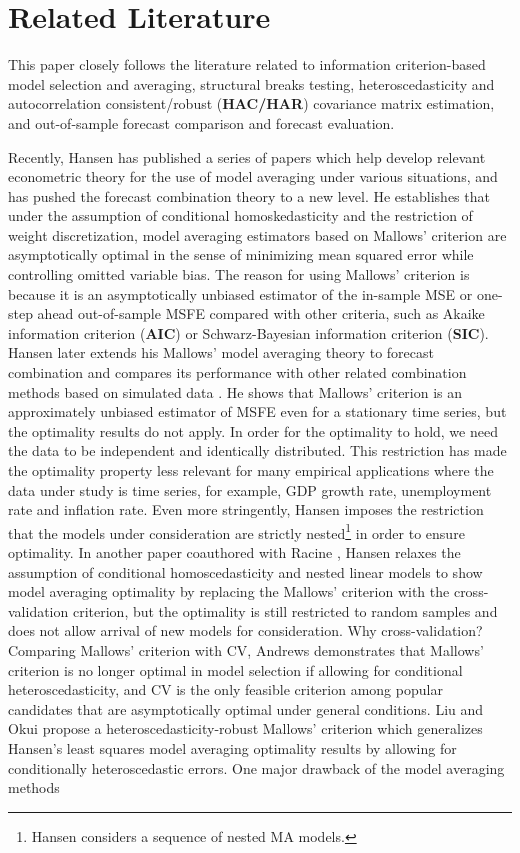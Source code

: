 \section{Related Literature}
This paper closely follows the literature related to information criterion-based model selection and averaging, structural breaks testing, heteroscedasticity and autocorrelation consistent/robust (\textbf{HAC/HAR}) covariance matrix estimation, and out-of-sample forecast comparison and forecast evaluation.

Recently, Hansen has published a series of papers \cite{hansen_EMETRICA2007} \cite{hansen_JE2008} \cite{hansen2009averaging} \cite{hansen2011jackknife} which help develop relevant econometric theory for the use of model averaging under various situations, and has pushed the forecast combination theory to a new level. He establishes that under the assumption of conditional homoskedasticity and the restriction of weight discretization, model averaging estimators based on Mallows' criterion are asymptotically optimal in the sense of minimizing mean squared error while controlling omitted variable bias. The reason for using Mallows' criterion is because it is an asymptotically unbiased estimator of the in-sample MSE or one-step ahead out-of-sample MSFE compared with other criteria, such as Akaike information criterion (\textbf{AIC}) or Schwarz-Bayesian information criterion (\textbf{SIC}). Hansen later extends his Mallows' model averaging theory to forecast combination and compares its performance with other related combination methods based on simulated data \cite{hansen_JE2008}. He shows that Mallows' criterion is an approximately unbiased estimator of MSFE even for a stationary time series, but the optimality results do not apply. In order for the optimality to hold, we need the data to be independent and identically distributed. This restriction has made the optimality property less relevant for many empirical applications where the data under study is time series, for example, GDP growth rate, unemployment rate and inflation rate. Even more stringently, Hansen imposes the restriction that the models under consideration are strictly nested\footnote{Hansen considers a sequence of nested MA models.} in order to ensure optimality. In another paper coauthored with Racine \cite{hansen2011jackknife}, Hansen relaxes the assumption of conditional homoscedasticity and nested linear models to show model averaging optimality by replacing the Mallows' criterion with the cross-validation criterion, but the optimality is still restricted to random samples and does not allow arrival of new models for consideration. Why cross-validation? Comparing Mallows' criterion with CV, Andrews \cite{andrews_JE1991} demonstrates that Mallows' criterion is no longer optimal in model selection if allowing for conditional heteroscedasticity, and CV is the only feasible criterion among popular candidates that are asymptotically optimal under general conditions. Liu and Okui \cite{liu_okui2012} propose a heteroscedasticity-robust Mallows' criterion which generalizes Hansen's least squares model averaging optimality results by allowing for conditionally heteroscedastic errors. One major drawback of the model averaging methods 